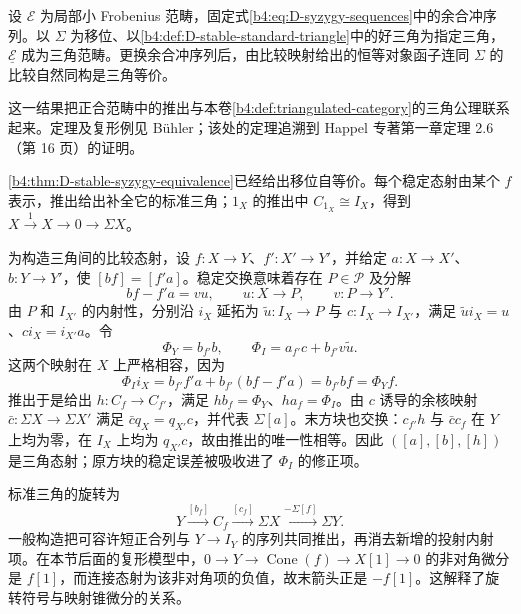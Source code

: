 \begin{theorem}[Happel]\label{b4:thm:D-happel-triangulation}
	设 \(\mathcal E\) 为局部小 Frobenius 范畴，固定式\eqref{b4:eq:D-syzygy-sequences}中的余合冲序列。以 \(\Sigma\) 为移位、以\cref{b4:def:D-stable-standard-triangle}中的好三角为指定三角，\(\underline{\mathcal E}\) 成为三角范畴。更换余合冲序列后，由比较映射给出的恒等对象函子连同 \(\Sigma\) 的比较自然同构是三角等价。
\end{theorem}

这一结果把正合范畴中的推出与本卷\cref{b4:def:triangulated-category}的三角公理联系起来。定理及复形例见 Bühler\cite[Section 13.4, Theorem 13.7 and Example 13.8]{Buehler2010ExactCategories}；该处的定理追溯到 Happel 专著第一章定理 2.6（第 16 页）的证明。

\begin{proofsketch}
	\cref{b4:thm:D-stable-syzygy-equivalence}已经给出移位自等价。每个稳定态射由某个 \(f\) 表示，推出给出补全它的标准三角；\(1_X\) 的推出中 \(C_{1_X}\cong I_X\)，得到 \(X\xrightarrow{1}X\to0\to\Sigma X\)。

	为构造三角间的比较态射，设 \(f:X\to Y\)、\(f':X'\to Y'\)，并给定 \(a:X\to X'\)、\(b:Y\to Y'\)，使 \([bf]=[f'a]\)。稳定交换意味着存在 \(P\in\mathcal P\) 及分解
	\[
		bf-f'a=vu,\qquad u:X\longrightarrow P,\qquad v:P\longrightarrow Y'.
	\]
	由 \(P\) 和 \(I_{X'}\) 的内射性，分别沿 \(i_X\) 延拓为 \(\widetilde u:I_X\to P\) 与 \(c:I_X\to I_{X'}\)，满足 \(\widetilde u i_X=u\)、\(ci_X=i_{X'}a\)。令
	\[
		\Phi_Y=b_{f'}b,\qquad \Phi_I=a_{f'}c+b_{f'}v\widetilde u.
	\]
	这两个映射在 \(X\) 上严格相容，因为
	\[
		\Phi_Ii_X=b_{f'}f'a+b_{f'}(bf-f'a) =b_{f'}bf=\Phi_Yf.
	\]
	推出于是给出 \(h:C_f\to C_{f'}\)，满足 \(hb_f=\Phi_Y\)、\(ha_f=\Phi_I\)。由 \(c\) 诱导的余核映射 \(\bar c:\Sigma X\to\Sigma X'\) 满足 \(\bar c q_X=q_{X'}c\)，并代表 \(\Sigma[a]\)。末方块也交换：\(c_{f'}h\) 与 \(\bar c c_f\) 在 \(Y\) 上均为零，在 \(I_X\) 上均为 \(q_{X'}c\)，故由推出的唯一性相等。因此 \(([a],[b],[h])\) 是三角态射；原方块的稳定误差被吸收进了 \(\Phi_I\) 的修正项。

	标准三角的旋转为
	\[
		Y\xrightarrow{[b_f]}C_f\xrightarrow{[c_f]}\Sigma X \xrightarrow{-\Sigma[f]}\Sigma Y.
	\]
	一般构造把可容许短正合列与 \(Y\to I_Y\) 的序列共同推出，再消去新增的投射内射项。在本节后面的复形模型中，\(0\to Y\to\operatorname{Cone}(f)\to X[1]\to0\) 的非对角微分是 \(f[1]\)，而连接态射为该非对角项的负值，故末箭头正是 \(-f[1]\)。这解释了旋转符号与映射锥微分的关系。


\end{proofsketch}
